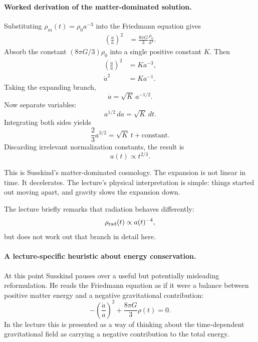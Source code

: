 \paragraph{Worked derivation of the matter-dominated solution.}
Substituting \(\rho_m(t)=\rho_0 a^{-3}\) into the Friedmann equation gives
\begin{align}
\left(\frac{\dot a}{a}\right)^2&=\frac{8\pi G}{3}\frac{\rho_0}{a^3}.
\end{align}
Absorb the constant \((8\pi G/3)\rho_0\) into a single positive constant \(K\). Then
\begin{align}
\left(\frac{\dot a}{a}\right)^2&=K a^{-3},\\
\dot a^2&=K a^{-1}.
\end{align}
Taking the expanding branch,
\begin{equation}
\dot a=\sqrt{K}\,a^{-1/2}.
\end{equation}
Now separate variables:
\begin{equation}
a^{1/2}\,da=\sqrt{K}\,dt.
\end{equation}
Integrating both sides yields
\begin{equation}
\frac{2}{3}a^{3/2}=\sqrt{K}\,t+\text{constant}.
\end{equation}
Discarding irrelevant normalization constants, the result is
\begin{equation}
a(t)\propto t^{2/3}.
\end{equation}

This is Susskind's matter-dominated cosmology. The expansion is not linear in time. It decelerates. The lecture's physical interpretation is simple: things started out moving apart, and gravity slows the expansion down.

The lecture briefly remarks that radiation behaves differently:
\begin{equation}
\rho_{\rm rad}(t)\propto a(t)^{-4},
\end{equation}
but does not work out that branch in detail here.

\paragraph{A lecture-specific heuristic about energy conservation.}
At this point Susskind pauses over a useful but potentially misleading reformulation. He reads the Friedmann equation as if it were a balance between positive matter energy and a negative gravitational contribution:
\begin{equation}
-\left(\frac{\dot a}{a}\right)^2+\frac{8\pi G}{3}\rho(t)=0.
\end{equation}
In the lecture this is presented as a way of thinking about the time-dependent gravitational field as carrying a negative contribution to the total energy.

